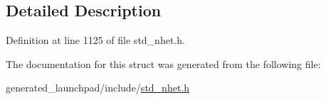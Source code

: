 \subsection{Detailed Description}


Definition at line 1125 of file std\+\_\+nhet.\+h.



The documentation for this struct was generated from the following file\+:\begin{DoxyCompactItemize}
\item 
generated\+\_\+launchpad/include/\mbox{\hyperlink{std__nhet_8h}{std\+\_\+nhet.\+h}}\end{DoxyCompactItemize}
